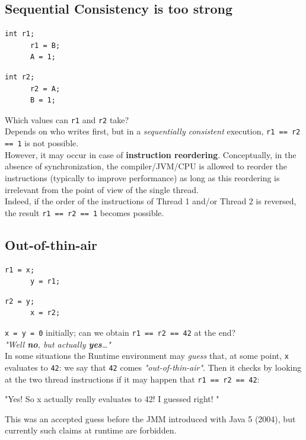 \subsection{Sequential Consistency is too strong}
\begin{paracol}{2}
   \begin{lstlisting}[caption={Thread 1}]
      int r1; 
      r1 = B;
      A = 1;
   \end{lstlisting}
\switchcolumn
   \begin{lstlisting}[caption={Thread 2}]
      int r2; 
      r2 = A;
      B = 1;
   \end{lstlisting}
\end{paracol}
Which values can \lstinline|r1| and \lstinline|r2| take?\\
Depends on who writes first, but in a \textit{sequentially consistent} execution, \lstinline|r1 == r2 == 1| is not possible.\\
However, it may occur in case of \textbf{instruction reordering}.
Conceptually, in the absence of synchronization, the compiler/JVM/CPU is
allowed to reorder the instructions (typically to improve performance) as
long as this reordering is irrelevant from the point of view of the single thread.\\
Indeed, if the order of the instructions of Thread 1 and/or Thread
2 is reversed, the result \lstinline|r1 == r2 == 1| becomes possible.



\subsection{Out-of-thin-air}
\begin{paracol}{2}
   \begin{lstlisting}[caption={Thread 1}]
      r1 = x;
      y = r1;
   \end{lstlisting}
\switchcolumn
   \begin{lstlisting}[caption={Thread 2}]
      r2 = y;
      x = r2;
   \end{lstlisting}
\end{paracol}
\lstinline|x = y = 0| initially;
can we obtain \lstinline|r1 == r2 == 42| at the end?\\
\textit{"Well \textbf{no}, but actually \textbf{yes}\dots"}\\
In some situations the Runtime environment may \textit{guess} that, 
at some point, \lstinline|x| evaluates to \lstinline|42|:
we say that \lstinline|42| comes \textit{"out-of-thin-air"}.
Then it checks by looking at the two thread instructions if it may happen that \lstinline|r1 == r2 == 42|:
\begin{center}
   "Yes! So x actually really evaluates to 42! I guessed right! \smiley"
\end{center}
This was an accepted guess before the JMM introduced with Java 5 (2004),
but currently such claims at runtime are forbidden.

